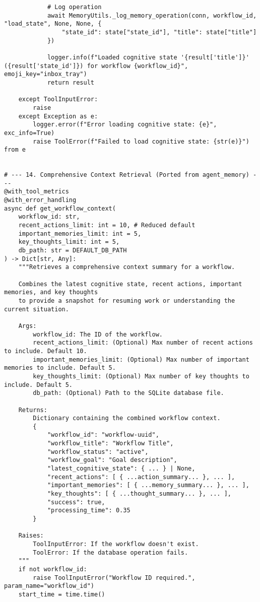 \documentclass[12pt,a4paper]{article}
\begin{document}
\begin{pageablecode}
\begin{verbatim}
            # Log operation
            await MemoryUtils._log_memory_operation(conn, workflow_id, "load_state", None, None, {
                "state_id": state["state_id"], "title": state["title"]
            })

            logger.info(f"Loaded cognitive state '{result['title']}' ({result['state_id']}) for workflow {workflow_id}", emoji_key="inbox_tray")
            return result

    except ToolInputError:
        raise
    except Exception as e:
        logger.error(f"Error loading cognitive state: {e}", exc_info=True)
        raise ToolError(f"Failed to load cognitive state: {str(e)}") from e


# --- 14. Comprehensive Context Retrieval (Ported from agent_memory) ---
@with_tool_metrics
@with_error_handling
async def get_workflow_context(
    workflow_id: str,
    recent_actions_limit: int = 10, # Reduced default
    important_memories_limit: int = 5,
    key_thoughts_limit: int = 5,
    db_path: str = DEFAULT_DB_PATH
) -> Dict[str, Any]:
    """Retrieves a comprehensive context summary for a workflow.

    Combines the latest cognitive state, recent actions, important memories, and key thoughts
    to provide a snapshot for resuming work or understanding the current situation.

    Args:
        workflow_id: The ID of the workflow.
        recent_actions_limit: (Optional) Max number of recent actions to include. Default 10.
        important_memories_limit: (Optional) Max number of important memories to include. Default 5.
        key_thoughts_limit: (Optional) Max number of key thoughts to include. Default 5.
        db_path: (Optional) Path to the SQLite database file.

    Returns:
        Dictionary containing the combined workflow context.
        {
            "workflow_id": "workflow-uuid",
            "workflow_title": "Workflow Title",
            "workflow_status": "active",
            "workflow_goal": "Goal description",
            "latest_cognitive_state": { ... } | None,
            "recent_actions": [ { ...action_summary... }, ... ],
            "important_memories": [ { ...memory_summary... }, ... ],
            "key_thoughts": [ { ...thought_summary... }, ... ],
            "success": true,
            "processing_time": 0.35
        }

    Raises:
        ToolInputError: If the workflow doesn't exist.
        ToolError: If the database operation fails.
    """
    if not workflow_id: 
        raise ToolInputError("Workflow ID required.", param_name="workflow_id")
    start_time = time.time()


\end{verbatim}
\end{pageablecode}
\end{document}
